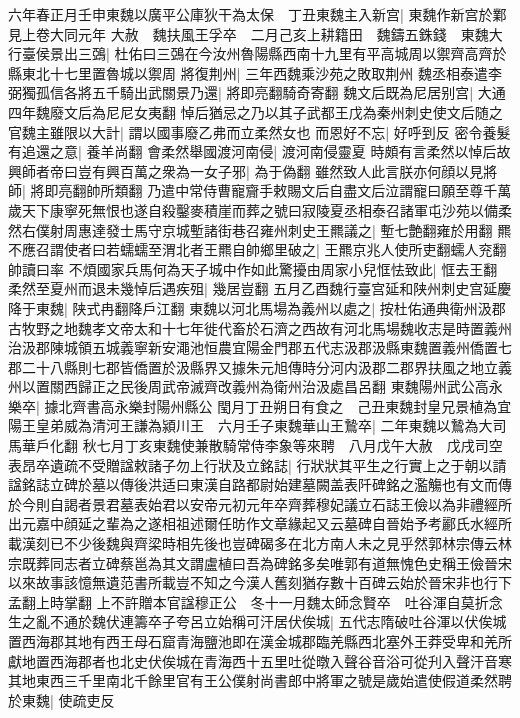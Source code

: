 六年春正月壬申東魏以廣平公庫狄干為太保　丁丑東魏主入新宫|{
	東魏作新宫於鄴見上卷大同元年}
大赦　魏扶風王孚卒　二月己亥上耕籍田　魏鑄五銖錢　東魏大行臺侯景出三鵶|{
	杜佑曰三鵶在今汝州魯陽縣西南十九里有平高城周以禦齊高齊於縣東北十七里置魯城以禦周}
將復荆州|{
	三年西魏乘沙苑之敗取荆州}
魏丞相泰遣李弼獨孤信各將五千騎出武關景乃還|{
	將即亮翻騎奇寄翻}
魏文后既為尼居别宫|{
	大通四年魏廢文后為尼尼女夷翻}
悼后猶忌之乃以其子武都王戊為秦州刺史使文后随之官魏主雖限以大計|{
	謂以國事廢乙弗而立柔然女也}
而恩好不忘|{
	好呼到反}
密令養髮有追還之意|{
	養羊尚翻}
會柔然舉國渡河南侵|{
	渡河南侵靈夏}
時頗有言柔然以悼后故興師者帝曰豈有興百萬之衆為一女子邪|{
	為于偽翻}
雖然致人此言朕亦何顔以見將師|{
	將即亮翻帥所類翻}
乃遣中常侍曹寵齎手敕賜文后自盡文后泣謂寵曰願至尊千萬歲天下康寧死無恨也遂自殺鑿麥積崖而葬之號曰寂陵夏丞相泰召諸軍屯沙苑以備柔然右僕射周惠達發士馬守京城塹諸街巷召雍州刺史王羆議之|{
	塹七艶翻雍於用翻}
羆不應召謂使者曰若蠕蠕至渭北者王羆自帥鄉里破之|{
	王羆京兆人使所吏翻蠕人兖翻帥讀曰率}
不煩國家兵馬何為天子城中作如此驚擾由周家小兒恇怯致此|{
	恇去王翻}
柔然至夏州而退未幾悼后遇疾殂|{
	幾居豈翻}
五月乙酉魏行臺宫延和陕州刺史宫延慶降于東魏|{
	陕式冉翻降戶江翻}
東魏以河北馬場為義州以處之|{
	按杜佑通典衛州汲郡古牧野之地魏孝文帝太和十七年徙代畜於石濟之西故有河北馬場魏收志是時置義州治汲郡陳城領五城義寧新安澠池恒農宜陽金門郡五代志汲郡汲縣東魏置義州僑置七郡二十八縣則七郡皆僑置於汲縣界又據朱元旭傳時分河内汲郡二郡界扶風之地立義州以置關西歸正之民後周武帝滅齊改義州為衛州治汲處昌呂翻}
東魏陽州武公高永樂卒|{
	據北齊書高永樂封陽州縣公}
閠月丁丑朔日有食之　己丑東魏封皇兄景植為宜陽王皇弟威為清河王謙為潁川王　六月壬子東魏華山王鷙卒|{
	二年東魏以鷙為大司馬華戶化翻}
秋七月丁亥東魏使兼散騎常侍李象等來聘　八月戊午大赦　戊戌司空表昂卒遺疏不受贈諡敕諸子勿上行狀及立銘誌|{
	行狀狀其平生之行實上之于朝以請諡銘誌立碑於墓以傳後洪适曰東漢自路都尉始建墓闕盖表阡碑銘之濫觴也有文而傳於今則自謁者景君墓表始君以安帝元初元年卒齊葬穆妃議立石誌王儉以為非禮經所出元嘉中顔延之輩為之遂相祖述爾任昉作文章緣起又云墓碑自晉始予考酈氏水經所載漢刻已不少後魏與齊梁時相先後也豈碑碣多在北方南人未之見乎然郭林宗傳云林宗既葬同志者立碑蔡邕為其文謂盧植曰吾為碑銘多矣唯郭有道無愧色史稱王儉晉宋以來故事該憶無遺范書所載豈不知之今漢人舊刻猶存數十百碑云始於晉宋非也行下孟翻上時掌翻}
上不許贈本官諡穆正公　冬十一月魏太師念賢卒　吐谷渾自莫折念生之亂不通於魏伏連籌卒子夸呂立始稱可汗居伏俟城|{
	五代志隋破吐谷渾以伏俟城置西海郡其地有西王母石窟青海鹽池即在漢金城郡臨羌縣西北塞外王莽受卑和羌所獻地置西海郡者也北史伏俟城在青海西十五里吐從暾入聲谷音浴可從刋入聲汗音寒}
其地東西三千里南北千餘里官有王公僕射尚書郎中將軍之號是歲始遣使假道柔然聘於東魏|{
	使疏吏反}


